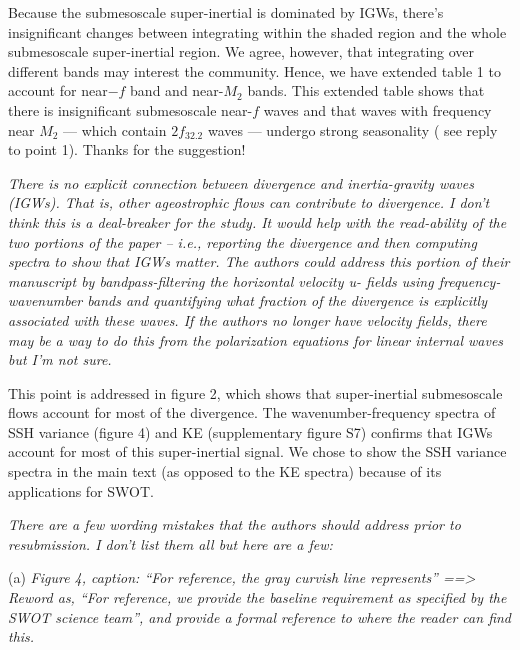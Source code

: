 \documentclass[11pt]{article}
\newcommand{\bdp}{\begin{description}}
\newcommand{\edp}{\end{description}}
\begin{document}
\begin{enumerate}
\bdp
    Because the submesoscale super-inertial is dominated by IGWs, there's insignificant changes
    between integrating within the shaded region and the whole submesoscale super-inertial region.
    We agree, however, that integrating over different bands may interest the community. Hence,
     we have extended table 1 to account for near$-f$ band and near-$M_2$ bands. This extended
     table shows that there is insignificant submesoscale near-$f$ waves and that waves with
     frequency near $M_2$ --- which contain $2 f_{32.2}$ waves --- undergo strong seasonality (
     see reply to point 1). Thanks for the suggestion!


\edp


\item {\it There is no explicit connection between divergence and inertia-gravity waves (IGWs). That
is, other ageostrophic flows can contribute to divergence. I don’t think this is a deal-breaker
for the study. It would help with the read-ability of the two portions of the paper – i.e.,
reporting the divergence and then computing spectra to show that IGWs matter. The authors
could address this portion of their manuscript by bandpass-filtering the horizontal velocity u-
fields using frequency-wavenumber bands and quantifying what fraction of the divergence is
explicitly associated with these waves. If the authors no longer have velocity fields, there may
be a way to do this from the polarization equations for linear internal waves but I’m not sure.}

\bdp
\item {\noindent This point is addressed in figure 2, which shows that super-inertial submesoscale
      flows account for most of the divergence. The wavenumber-frequency spectra of
      SSH variance (figure 4) and KE (supplementary figure S7) confirms that IGWs account
      for most of this super-inertial signal. We chose to show the SSH variance spectra in
      the main text (as opposed to the KE spectra) because of its applications for SWOT.}
\edp


\item{\it  There are a few wording mistakes that the authors should address prior to resubmission. I
don’t list them all but here are a few:}

  \subitem (a) {\it Figure 4, caption: “For reference, the gray curvish line represents” ==> Reword as,
  “For reference, we provide the baseline requirement as specified by the SWOT
  science team”, and provide a formal reference to where the reader can find this.}


\end{enumerate}
\end{document}
